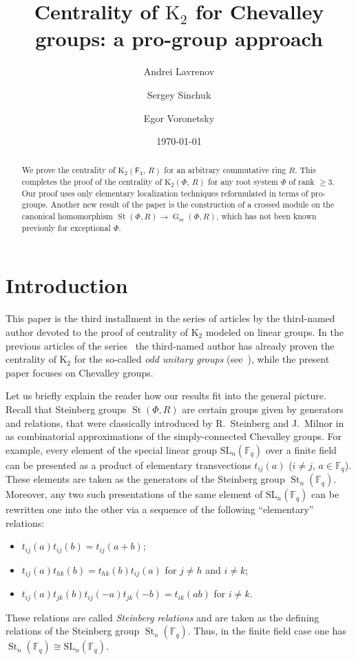 \documentclass[oneside, 11pt]{amsart}
\title{Centrality of $\mathrm K_2$ for Chevalley groups: a pro-group approach}
\author[1] {Andrei Lavrenov} \email{avlavrenov at gmail.com}
\author[2] {Sergey Sinchuk} \email{sinchukss at gmail.com}
\author[3] {Egor Voronetsky} \email{voronetckiiegor at yandex.ru}
\date {\today}
\numberwithin{equation}{section}
\theoremstyle{definition}
\theoremstyle{remark}
\DeclareMathOperator\St{St}
\DeclareMathOperator\GG{G}
\newcommand{\rF}{\mathsf{F}}
\begin{document}
\maketitle
\begin{abstract} 
We prove the centrality of $\mathrm K_2 (\rF_4, \,R)$ for an arbitrary commutative ring $R$. This completes the proof of the centrality of $\mathrm K_2(\Phi,\, R)$ for any root system $\Phi$ of rank $\geq 3$. Our proof uses only elementary localization techniques reformulated in terms of pro-groups. 
Another new result of the paper is the construction of a crossed module on the canonical homomorphism $\St(\Phi, R) \to \GG_\mathrm{sc}(\Phi, R)$, which has not been known previouly for exceptional $\Phi$. \end{abstract}

\section{Introduction}
This paper is the third installment in the series of articles by the third-named author devoted to the proof of centrality of $\mathrm K_2$ modeled on linear groups. In the previous articles of the series~\cite{Vor1, Vor2} the third-named author has already proven the centrality of $\mathrm K_2$ for the so-called {\it odd unitary groups} (see~\cite{Pe05}), while the present paper focuses on Chevalley groups.

Let us briefly explain the reader how our results fit into the general picture.
Recall that Steinberg groups $\St(\Phi, R)$ are certain groups given by generators and relations, that were classically introduced by R.~Steinberg and J.~Milnor in~\cite{St62, Milnor} as combinatorial approximations of the simply-connected Chevalley groups. For example, every element of the special linear group $\mathrm{SL}_n(\mathbb F_q)$ over a finite field can be presented as a product of elementary transvections $t_{ij}(a)$ ($i\neq j$, $a\in \mathbb F_q$). These elements are taken as the generators of the Steinberg group $\St_n(\mathbb{F}_q)$. 
Moreover, any two such presentations of the same element of $\mathrm{SL}_n(\mathbb{F}_q)$ can be rewritten one into the other
 via a sequence of the following ``elementary'' relations: 
\begin{itemize} 
 \item $t_{ij}(a)t_{ij}(b) = t_{ij}(a+b)$; 
 \item $t_{ij}(a)t_{hk}(b) = t_{hk}(b)t_{ij}(a)$ for $j\neq h$ and $i\neq k$; 
 \item $t_{ij}(a)t_{jk}(b)t_{ij}(-a)t_{jk}(-b) = t_{ik}(ab)$ for $i\neq k$.
\end{itemize} 
These relations are called {\it Steinberg relations} and are taken as the defining relations of the Steinberg group $\St_n(\mathbb{F}_q)$. Thus, in the finite field case one has $\St_n(\mathbb{F}_q) \cong \mathrm{SL}_n(\mathbb{F}_q)$.
\end{document}
